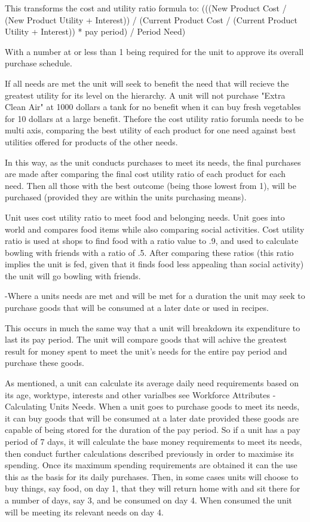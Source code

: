 This transforms the cost and utility ratio formula to: 
(((New Product Cost / (New Product Utility + Interest)) / (Current Product Cost / (Current Product Utility + Interest)) * pay period) / Period Need)

With a number at or less than 1 being required for the unit to approve its overall purchase schedule.


If all needs are met the unit will seek to benefit the need that will recieve the greatest utility for its level on the hierarchy. A unit will not purchase "Extra Clean Air" at 1000 dollars a tank for no benefit when it can buy fresh vegetables for 10 dollars at a large benefit. Thefore the cost utility ratio forumla needs to be multi axis, comparing the best utility of each product for one need against best utilities offered for products of the other needs.

In this way, as the unit conducts purchases to meet its needs, the final purchases are made after comparing the final cost utility ratio of each product for each need. Then all those with the best outcome (being those lowest from 1), will be purchased (provided they are within the units purchasing means).

Unit uses cost utility ratio to meet food and belonging needs.
Unit goes into world and compares food items while also comparing social activities.
Cost utility ratio is used at shops to find food with a ratio value to .9, and used to calculate bowling with friends with a ratio of .5. After comparing these ratios (this ratio implies the unit is fed, given that it finds food less appealing than social activity) the unit will go bowling with friends.



-Where a units needs are met and will be met for a duration the unit may seek to purchase goods that will be consumed at a later date or used in recipes.

This occurs in much the same way that a unit will breakdown its expenditure to last its pay period. The unit will compare goods that will achive the greatest result for money spent to meet the unit's needs for the entire pay period and  purchase these goods.

As mentioned, a unit can calculate its average daily need requirements based on its age, worktype, interests and other varialbes see Workforce Attributes - Calculating Units Needs. When a unit goes to purchase goods to meet its needs, it can buy goods that will be consumed at a later date provided these goods are capable of being stored for the duration of the pay period. So if a unit has a pay period of 7 days, it will calculate the base money requirements to meet its needs, then conduct further calculations described previously in order to maximise its spending. Once its maximum spending requirements are obtained it can the use this as the basis for its daily purchases. Then, in some cases units will choose to buy things, say food, on day 1, that they will return home with and sit there for a number of days, say 3, and be consumed on day 4. When consumed the unit will be meeting its relevant needs on day 4.

